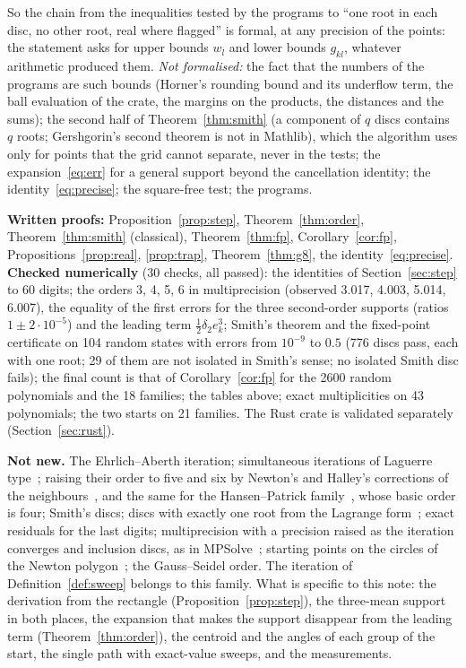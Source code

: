 \documentclass[10pt,a4paper]{article}
\theoremstyle{definition}
\numberwithin{equation}{section}
\begin{document}
So the chain from the inequalities tested by the programs to ``one root in each disc, no other root,
real where flagged'' is formal, at any precision of the points: the statement asks for upper bounds
$w_l$ and lower bounds $g_{kl}$, whatever arithmetic produced them. \emph{Not formalised:} the fact
that the numbers of the programs are such bounds (Horner's rounding bound and its underflow term, the
ball evaluation of the crate, the margins on the products, the distances and the sums); the second half
of Theorem~\ref{thm:smith} (a component of $q$ discs contains $q$ roots; Gershgorin's second theorem is
not in Mathlib), which the algorithm uses only for points that the grid cannot separate, never in the
tests; the expansion~\eqref{eq:err} for a general support beyond the cancellation identity; the
identity~\eqref{eq:precise}; the square-free test; the programs.

\textbf{Written proofs:} Proposition~\ref{prop:step}, Theorem~\ref{thm:order},
Theorem~\ref{thm:smith} (classical), Theorem~\ref{thm:fp}, Corollary~\ref{cor:fp},
Propositions~\ref{prop:real}, \ref{prop:trap}, Theorem~\ref{thm:g8}, the identity~\eqref{eq:precise}.
\textbf{Checked numerically} (30 checks, all passed): the identities of
Section~\ref{sec:step} to 60 digits; the orders 3, 4, 5, 6 in multiprecision (observed 3.017, 4.003,
5.014, 6.007), the equality of the first errors for the three second-order supports (ratios
$1\pm2\cdot10^{-5}$) and the leading term $\frac12\delta_2e_k^3$; Smith's theorem and the fixed-point
certificate on 104 random states with errors from $10^{-9}$ to $0.5$ (776 discs pass, each with one
root; 29 of them are not isolated in Smith's sense; no isolated Smith disc fails); the final count is
that of Corollary~\ref{cor:fp} for the 2600 random polynomials and the 18 families; the tables above;
exact multiplicities on 43 polynomials; the two starts on 21 families. The Rust crate is validated
separately (Section~\ref{sec:rust}).

\textbf{Not new.} The Ehrlich--Aberth iteration; simultaneous iterations of Laguerre type~\cite{hpr};
raising their order to five and six by Newton's and Halley's corrections of the
neighbours~\cite{nourein,ppz}, and the same for the Hansen--Patrick family~\cite{hp,prp}, whose basic
order is four; Smith's discs; discs with exactly one root from the Lagrange form~\cite{bs,bh}; exact
residuals for the last digits; multiprecision with a precision raised as the iteration converges and
inclusion discs, as in MPSolve~\cite{mpsolve}; starting points on the circles of the Newton
polygon~\cite{bini}; the Gauss--Seidel order. The iteration of Definition~\ref{def:sweep} belongs to
this family. What is specific to this note: the derivation from the rectangle
(Proposition~\ref{prop:step}), the three-mean support in both places, the expansion that makes the
support disappear from the leading term (Theorem~\ref{thm:order}), the centroid and the angles of each
group of the start, the single path with exact-value sweeps, and the measurements.
\end{document}
